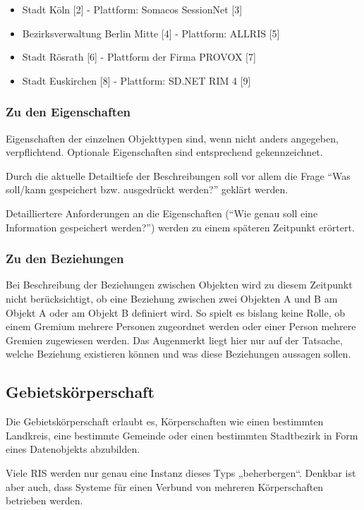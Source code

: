 \begin{itemize}
\item
  Stadt Köln {[}2{]} - Plattform: Somacos SessionNet {[}3{]}
\item
  Bezirksverwaltung Berlin Mitte {[}4{]} - Plattform: ALLRIS {[}5{]}
\item
  Stadt Rösrath {[}6{]} - Plattform der Firma PROVOX {[}7{]}
\item
  Stadt Euskirchen {[}8{]} - Plattform: SD.NET RIM 4 {[}9{]}
\end{itemize}

\subsubsection{Zu den Eigenschaften}

Eigenschaften der einzelnen Objekttypen sind, wenn nicht anders
angegeben, verpflichtend. Optionale Eigenschaften sind entsprechend
gekennzeichnet.

Durch die aktuelle Detailtiefe der Beschreibungen soll vor allem die
Frage ``Was soll/kann gespeichert bzw. ausgedrückt werden?'' geklärt
werden.

Detailliertere Anforderungen an die Eigenschaften (``Wie genau soll eine
Information gespeichert werden?'') werden zu einem späteren Zeitpunkt
erörtert.

\subsubsection{Zu den Beziehungen}

Bei Beschreibung der Beziehungen zwischen Objekten wird zu diesem
Zeitpunkt nicht berücksichtigt, ob eine Beziehung zwischen zwei Objekten
A und B am Objekt A oder am Objekt B definiert wird. So spielt es
bislang keine Rolle, ob einem Gremium mehrere Personen zugeordnet werden
oder einer Person mehrere Gremien zugewiesen werden. Das Augenmerkt
liegt hier nur auf der Tatsache, welche Beziehung existieren können und
was diese Beziehungen aussagen sollen.

\subsection{Gebietskörperschaft}

Die Gebietskörperschaft erlaubt es, Körperschaften wie einen bestimmten
Landkreis, eine bestimmte Gemeinde oder einen bestimmten Stadtbezirk in
Form eines Datenobjekts abzubilden.

Viele RIS werden nur genau eine Instanz dieses Typs „beherbergen``.
Denkbar ist aber auch, dass Systeme für einen Verbund von mehreren
Körperschaften betrieben werden.

